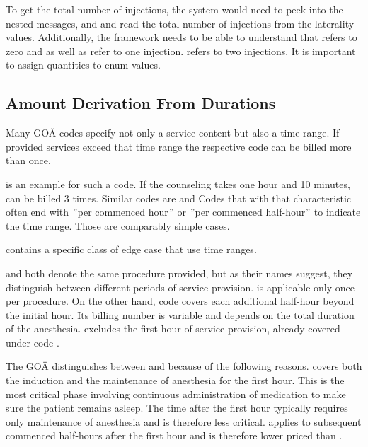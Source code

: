 To get the total number of injections, the system would need to peek into the nested messages, and and read the total number of injections from the laterality values.
Additionally, the framework needs to be able to understand that  refers to zero and  as well as refer to one injection.
 refers to two injections.
It is important to assign quantities to enum values.

\subsection{Amount Derivation From Durations}\label{subsec:amount-derivation-from-durations}

Many GOÄ codes specify not only a service content but also a time range.
If provided services exceed that time range the respective code can be billed more than once.

 is an example for such a code.
If the counseling takes one hour and 10 minutes,  can be billed 3 times.
Similar codes are 
and 
Codes that with that characteristic often end with \("\)per commenced hour\("\) or \("\)per commenced half-hour\("\) to indicate the time range.
Those are comparably simple cases.

 contains a specific class of edge case that use time ranges.

 and 
both denote the same procedure provided, but as their names suggest, they distinguish between different periods of service provision.
 is applicable only once per procedure.
On the other hand, code  covers each additional half-hour beyond the initial hour.
Its billing number is variable and depends on the total duration of the anesthesia.
 excludes the first hour of service provision, already covered under code .

The GOÄ distinguishes between  and  because of the following reasons.
 covers both the induction and the maintenance of anesthesia for the first hour.
This is the most critical phase involving continuous administration of medication to make sure the patient remains asleep.
The time after the first hour typically requires only maintenance of anesthesia and is therefore less critical.
 applies to subsequent commenced half-hours after the first hour and is therefore lower priced than .


